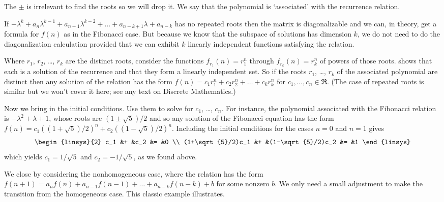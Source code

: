 The $\pm$ is irrelevant to find the roots
so we will drop it.
We say that the polynomial is `associated' with the recurrence 
relation.

If  
$-\lambda^k+a_n\lambda^{k-1}+a_{n-1}\lambda^{k-2}
   +\dots+a_{n-k+1}\lambda+a_{n-k}$
has no repeated roots 
then the matrix is diagonalizable
and we can, in theory, get a formula for $f(n)$ as in the Fibonacci case.
But because we know that the subspace of solutions has dimension $k$, 
we do not need to do the diagonalization calculation provided that 
we can exhibit $k$ linearly independent functions satisfying the relation.

Where $r_1$, $r_2$, \ldots, $r_k$ are the distinct roots,
consider the functions $f_{r_1}(n)=r_1^n$ through
$f_{r_k}(n)=r_k^n$ of powers of those roots.
 shows that 
each is a solution of the recurrence and that they form a 
linearly independent set.
So if the roots $r_1$, \ldots, $r_k$ of the associated polynomial 
are distinct then
any solution of the relation has the form 
$f(n)=c_1r_1^n+c_2r_2^n+\dots+c_kr_k^n$ for $c_1, \dots, c_n\in\Re$.
(The case of repeated roots is similar but we won't
cover it here; see any text on Discrete Mathematics.)

Now we bring in the initial conditions. 
Use them to solve for $c_1$, \ldots, $c_n$.
For instance, the polynomial associated with the Fibonacci relation is
$-\lambda^2+\lambda+1$, whose roots are $(1\pm\sqrt{5})/2$
and so any solution of the Fibonacci equation 
has the form $f(n)=c_1((1+\sqrt{5})/2)^n+c_2((1-\sqrt{5})/2)^n$.
Including the initial conditions for the cases $n=0$ and $n=1$ gives
\begin{equation*}
  \begin{linsys}{2}
    c_1               &+  &c_2               &=  &0  \\
    (1+\sqrt{5}/2)c_1 &+  &(1-\sqrt{5}/2)c_2 &=  &1
  \end{linsys}
\end{equation*}
which yields $c_1=1/\sqrt{5}$ and $c_2=-1/\sqrt{5}$, as we found above.

We close by considering the nonhomogeneous case,
where the relation has the form
$f(n+1)=a_nf(n)+a_{n-1}f(n-1)+\dots+a_{n-k}f(n-k)+b$ for some nonzero $b$.
We only need a small adjustment
to make the transition from the homogeneous case.
This classic example illustrates.

